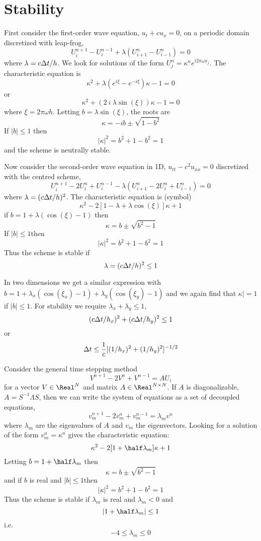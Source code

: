 \documentclass[10pt]{article}
\begin{document}
\section{Stability}

First consider the first-order wave equation, $u_t + c u_x =0$, on a periodic
domain discretized with leap-frog,
\[
    U_i^{n+1} - U_i^{n-1} + \lambda( U_{i+1}^n - U_{i-1}^n )=0
\]
where $\lambda=c {\Delta t}/h$.
We look for solutions of the form $U_j^n = \kappa^n e^{i 2\pi\omega x_j}$. The characteristic equation is
\[
   \kappa^2 +\lambda( e^{i\xi} -e^{-i\xi} )\kappa -1 =0
\]
 or
\[
  \kappa^2 +  (2~i~\lambda\sin(\xi))\kappa -1 =0
\]
where $\xi=2\pi\omega h$. Letting $b=\lambda\sin(\xi)$, the roots are
\[
   \kappa = -ib \pm \sqrt{ 1-b^2 }
\]
If $|b|\le 1$ then
\[
  |\kappa|^2 = b^2 + 1-b^2 =1 
\]
and the scheme is neutrally stable.

Now consider the second-order wave equation in 1D, $u_{tt} - c^2 u_{xx}=0$ discretized
with the centred scheme,
\[
    U_i^{n+1} -2U_i^n + U_i^{n-1} - \lambda( U_{i+1}^n -2U_i^n + U_{i-1}^n )=0
\]
where $\lambda=(c{\Delta t}/h)^2$.
The characteristic equation is (symbol)
\[
   \kappa^2 - 2[ 1-\lambda +\lambda\cos(\xi)]\kappa +1
\]
if $b=1+\lambda(\cos(\xi)-1)$ then
\[
   \kappa = b \pm \sqrt{b^2-1}
\]
If $|b|\le 1 $then
\[
  |\kappa|^2 = b^2 + 1-b^2 =1 
\]
Thus the scheme is stable if
\[
    \lambda = (c{\Delta t}/h)^2 \le 1
\]

In two dimensions we get a similar expression with $b=1 +\lambda_x(\cos(\xi_x)-1)+\lambda_y(\cos(\xi_y)-1)$
and we again find that $\kappa|=1$ if $|b|\le1$. 
For stability we require $\lambda_x+\lambda_y \le 1$, 
\[
     (c{\Delta t}/h_x)^2 + (c{\Delta t}/h_y)^2 \le 1
\]
or
\begin{equation}
    {\Delta t} \le {1\over c} [ (1/h_x)^2 + (1/h_y)^2]^{-1/2} \label{eq:timeStepRestriction}
\end{equation}


Consider the general time stepping method
\[
    V^{n+1} -2 V^n + V^{n-1} = A U_i 
\]
for a vector $V\in \Real^N$ and matrix $A\in \Real^{N\times N}$. 
If $A$ is diagonalizable, $A=S^{-1} \Lambda S$, then we can write the system of equations as a 
set of decoupled equations,
\[
    v_m^{n+1} -2v_m^n + v_m^{n-1} = \lambda_m v^n
\]
where $\lambda_m$ are the eigenvalues of $A$ and $v_m$ the eigenvectors.
Looking for a solution of the form $v_m^n=\kappa^n$ gives the
characteristic equation:
\[
    \kappa^2 - 2[ 1 +\half \lambda_m]\kappa +1
\]
Letting $b=1 +\half \lambda_m$ then
\[
  \kappa = b \pm \sqrt{b^2-1}
\]
and if $b$ is real and $|b|\le 1 $then
\[
  |\kappa|^2 = b^2 + 1-b^2 =1 
\]
Thus the scheme is stable if $\lambda_m$ is real and $\lambda_m<0$ and 
\[
    |1 +\half \lambda_m|  \le 1
\]
i.e.
\begin{equation}
     -4 \le \lambda_m \le 0    \label{generalStability}
\end{equation}
\end{document}
